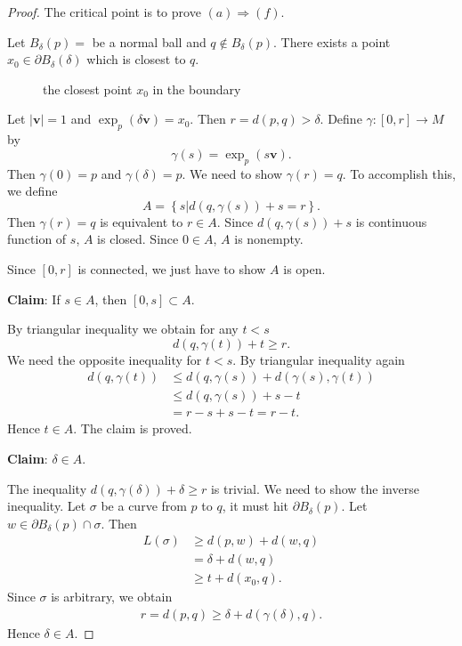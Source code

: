 \begin{proof}
  The critical point is to prove $(a)\Rightarrow(f)$.

  Let $B_{\delta}(p)=$ be a normal ball and $q\notin B_{\delta}(p)$. There exists a point  $x_0\in \partial B_{\delta}(\delta)$ which is closest to $q $.
\begin{figure}[ht]
    \centering
    \caption{the closest point $x_0$ in the boundary}
    \label{fig:the-closest-point--in-the-boundary}
\end{figure}
Let $|\mathbf{v}|=1$ and $\exp_p(\delta \mathbf{v})=x_0$. Then $r={d}(p,q)>\delta$. Define $\gamma:[0,r]\to M$ by 
\[
  \gamma(s)=\exp_p(s\mathbf{v}).
\] 
Then $\gamma(0)=p$ and $\gamma(\delta)=p$.
We need to show $\gamma(r)=q$. To accomplish this, we define 
 \[
   A=\left\{s|{d}(q,\gamma(s))+s=r\right\}.
 \]
 Then $\gamma(r)=q$ is equivalent to $r\in A$. Since ${d}(q,\gamma(s))+s$ is continuous function of $s$, $A$ is closed. Since $0\in A$, $A$ is nonempty.

 Since $[0,r]$ is connected, we just have to show $A$ is open. 
 
 \textbf{Claim}: If  $s\in A$, then $[0,s]\subset  A$.

 By triangular inequality we obtain for any $t<s$ 
 \[
  {d}(q,\gamma(t))+t\ge r. 
 \] 
 We need the opposite inequality for $t<s$. By triangular inequality again
 \begin{align*}
   {d}(q,\gamma(t)) &\le d(q,\gamma(s))+d(\gamma(s),\gamma(t))\\
   &\le d(q,\gamma(s))+s-t\\
   &=r-s+s-t=r-t
 .\end{align*}
 Hence $t\in A$. The claim is proved.

 \textbf{Claim}:  $\delta \in A$.

 The inequality $d(q,\gamma(\delta))+\delta \ge r$ is trivial. We need to show the inverse inequality. Let $\sigma$ be a curve from $p$ to $q$, it must hit $\partial B_\delta(p)$. Let $w\in \partial B_{\delta}(p)\cap \sigma$. Then 
 \begin{align*}
   L(\sigma) &\ge d(p,w)+d(w,q)\\
	     &=\delta+d(w,q)\\
	     &\ge t+d(x_0,q)
 .\end{align*}
 Since $\sigma$ is arbitrary, we obtain
 \begin{align*}
   r=d(p,q)\ge \delta+d(\gamma(\delta),q)
 .\end{align*}
 Hence $\delta\in A$.


\end{proof}
